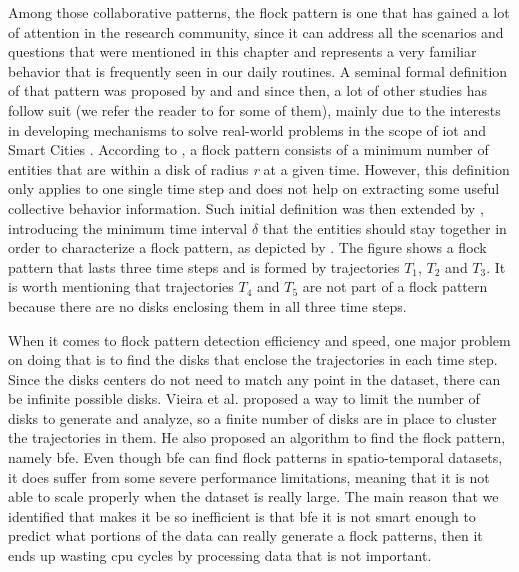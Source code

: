 Among those collaborative patterns, the flock pattern is one that has gained a lot of attention in the research community, since it
%
%
can address all the scenarios and questions that were mentioned in this chapter and represents a very familiar behavior
that is frequently seen in our daily routines. A seminal formal definition of that pattern was proposed by \citep{remo}
and \citep{gudefficient} and since then, a lot of other studies has follow suit (we refer the reader to
 for some of them), mainly due to the interests in developing mechanisms to solve real-world
problems in the scope of \ac{iot} \citep{iot} and Smart Cities \citep{smartcities}.  According to \citep{gudefficient},
a flock pattern consists of a minimum number of entities that are within a disk of radius \textit{r} at a given time.
However, this definition only applies to one single time step and does not help on extracting some useful collective
behavior information. Such initial definition was then extended by \citep{gudreportingflock}, introducing the minimum
time interval $\delta$ that the entities should stay together in order to characterize a flock pattern, as depicted by
. The figure shows a flock pattern that lasts three time steps and is formed by trajectories $T_1$,
$T_2$ and $T_3$. It is worth mentioning that trajectories $T_4$ and $T_5$ are not part of a flock pattern because there
are no disks enclosing them in all three time steps.

When it comes to flock pattern detection efficiency and speed, one major problem on doing that is to find the disks that
enclose the trajectories in each time step. Since the disks centers do not need to match any point in the dataset, there
can be infinite possible disks. Vieira et al. \citep{vieira} proposed a way to limit the number of disks to generate and
analyze, so a finite number of disks are in place to cluster the trajectories in them. He also proposed an algorithm to
find the flock pattern, namely \ac{bfe}. Even though \ac{bfe} can find flock patterns in spatio-temporal datasets, it
does suffer from some severe performance limitations, meaning that it is not able to scale properly when the dataset is
really large. The main reason that we identified that makes it be so inefficient is that \ac{bfe} it is not smart enough
to predict what portions of the data can really generate a flock patterns, then it ends up wasting \ac{cpu} cycles by
processing data that is not important.

